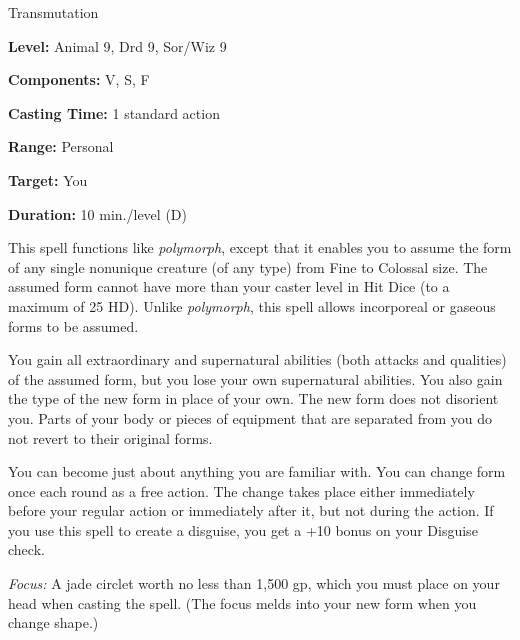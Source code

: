 
Transmutation

\textbf{Level:} Animal 9, Drd 9, Sor/Wiz 9

\textbf{Components:} V, S, F

\textbf{Casting Time:} 1 standard action

\textbf{Range:} Personal

\textbf{Target:} You

\textbf{Duration:} 10 min./level (D)

This spell functions like \textit{polymorph}, except that it enables you to assume 
the form of any single nonunique creature (of any type) from Fine to Colossal size. 
The assumed form cannot have more than your caster level in Hit Dice (to a maximum 
of 25 HD). Unlike \textit{polymorph}, this spell allows incorporeal or gaseous 
forms to be assumed.

You gain all extraordinary and supernatural abilities (both attacks and qualities) 
of the assumed form, but you lose your own supernatural abilities. You also gain 
the type of the new form in place of your own. The new form does not disorient 
you. Parts of your body or pieces of equipment that are separated from you do not 
revert to their original forms.

You can become just about anything you are familiar with. You can change form once 
each round as a free action. The change takes place either immediately before your 
regular action or immediately after it, but not during the action. If you use this 
spell to create a disguise, you get a +10 bonus on your Disguise check.

\textit{Focus:} A jade circlet worth no less than 1,500 gp, which you must place 
on your head when casting the spell. (The focus melds into your new form when you 
change shape.)

